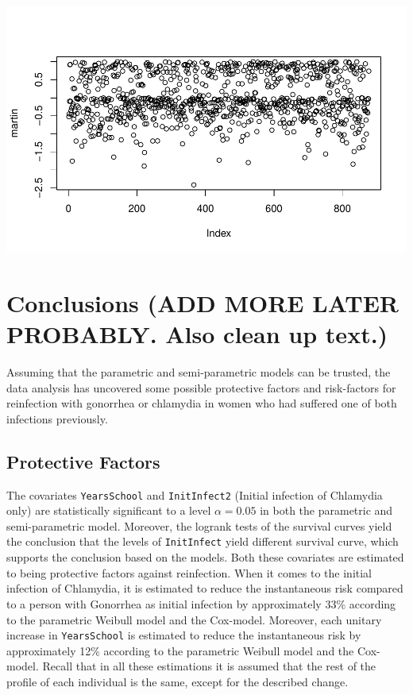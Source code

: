 \documentclass[
]{article}
\begin{document}
\includegraphics{practical_files/figure-latex/unnamed-chunk-8-1.pdf}

\hypertarget{conclusions-add-more-later-probably.-also-clean-up-text.}{%
\section{Conclusions (ADD MORE LATER PROBABLY. Also clean up text.)}\label{conclusions-add-more-later-probably.-also-clean-up-text.}}

Assuming that the parametric and semi-parametric models can be trusted, the data analysis has uncovered some possible protective factors and risk-factors for reinfection with gonorrhea or chlamydia in women who had suffered one of both infections previously.

\hypertarget{protective-factors}{%
\subsection{Protective Factors}\label{protective-factors}}

The covariates \texttt{YearsSchool} and \texttt{InitInfect2} (Initial infection of Chlamydia only) are statistically significant to a level \(\alpha = 0.05\) in both the parametric and semi-parametric model. Moreover, the logrank tests of the survival curves yield the conclusion that the levels of \texttt{InitInfect} yield different survival curve, which supports the conclusion based on the models. Both these covariates are estimated to being protective factors against reinfection. When it comes to the initial infection of Chlamydia, it is estimated to reduce the instantaneous risk compared to a person with Gonorrhea as initial infection by approximately 33\% according to the parametric Weibull model and the Cox-model. Moreover, each unitary increase in \texttt{YearsSchool} is estimated to reduce the instantaneous risk by approximately 12\% according to the parametric Weibull model and the Cox-model. Recall that in all these estimations it is assumed that the rest of the profile of each individual is the same, except for the described change.
\end{document}
